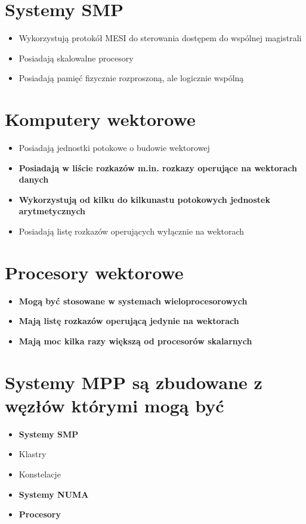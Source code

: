 \documentclass[a4paper,twoside]{article}
\begin{document}
\section{Systemy SMP}
	\begin{itemize}
    \item Wykorzystują protokół MESI do sterowania dostępem do wspólnej magistrali
    \item Posiadają skalowalne procesory
    \item Posiadają pamięć fizycznie rozproszoną, ale logicznie wspólną
    \end{itemize}

\section{Komputery wektorowe}
	\begin{itemize}
    \item Posiadają jednostki potokowe o budowie wektorowej
    \item \textbf{Posiadają w liście rozkazów m.in. rozkazy operujące na wektorach danych}
    \item \textbf{Wykorzystują od kilku do kilkunastu potokowych jednostek arytmetycznych}
    \item Posiadają listę rozkazów operujących wyłącznie na wektorach
    \end{itemize}

\section{Procesory wektorowe}
	\begin{itemize}
    \item \textbf{Mogą być stosowane w systemach wieloprocesorowych}
    \item \textbf{Mają listę rozkazów operującą jedynie na wektorach}
    \item \textbf{Mają moc kilka razy większą od procesorów skalarnych}
    \end{itemize}

\section{Systemy MPP są zbudowane z węzłów którymi mogą być}
	\begin{itemize}
    \item \textbf{Systemy SMP}
    \item Klastry
    \item Konstelacje
    \item \textbf{Systemy NUMA}
    \item \textbf{Procesory}
    \end{itemize}
\end{document}
